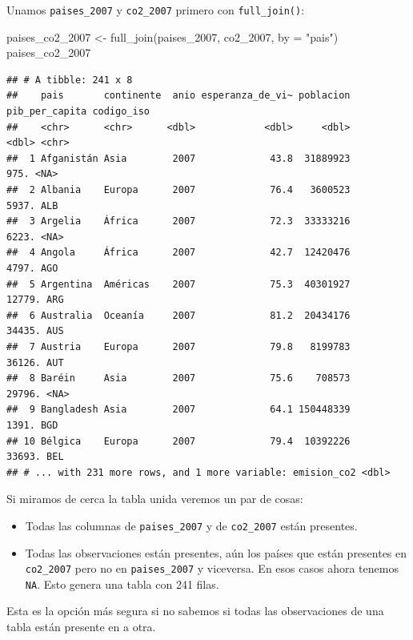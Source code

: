 \documentclass[
  openany]{book}
\newenvironment{Shaded}{\begin{snugshade}}{\end{snugshade}}
\newcommand{\AttributeTok}[1]{\textcolor[rgb]{0.77,0.63,0.00}{#1}}
\newcommand{\FunctionTok}[1]{\textcolor[rgb]{0.00,0.00,0.00}{#1}}
\newcommand{\NormalTok}[1]{#1}
\newcommand{\OtherTok}[1]{\textcolor[rgb]{0.56,0.35,0.01}{#1}}
\newcommand{\StringTok}[1]{\textcolor[rgb]{0.31,0.60,0.02}{#1}}
\providecommand{\tightlist}{%
  \setlength{\itemsep}{0pt}\setlength{\parskip}{0pt}}
\begin{document}
Unamos \texttt{paises\_2007} y \texttt{co2\_2007} primero con \texttt{full\_join()}:

\begin{Shaded}
\begin{Highlighting}[]
\NormalTok{paises\_co2\_2007 }\OtherTok{\textless{}{-}} \FunctionTok{full\_join}\NormalTok{(paises\_2007, co2\_2007, }\AttributeTok{by =} \StringTok{"pais"}\NormalTok{)}
\NormalTok{paises\_co2\_2007}
\end{Highlighting}
\end{Shaded}

\begin{verbatim}
## # A tibble: 241 x 8
##    pais       continente  anio esperanza_de_vi~ poblacion pib_per_capita codigo_iso
##    <chr>      <chr>      <dbl>            <dbl>     <dbl>          <dbl> <chr>     
##  1 Afganistán Asia        2007             43.8  31889923           975. <NA>      
##  2 Albania    Europa      2007             76.4   3600523          5937. ALB       
##  3 Argelia    África      2007             72.3  33333216          6223. <NA>      
##  4 Angola     África      2007             42.7  12420476          4797. AGO       
##  5 Argentina  Américas    2007             75.3  40301927         12779. ARG       
##  6 Australia  Oceanía     2007             81.2  20434176         34435. AUS       
##  7 Austria    Europa      2007             79.8   8199783         36126. AUT       
##  8 Baréin     Asia        2007             75.6    708573         29796. <NA>      
##  9 Bangladesh Asia        2007             64.1 150448339          1391. BGD       
## 10 Bélgica    Europa      2007             79.4  10392226         33693. BEL       
## # ... with 231 more rows, and 1 more variable: emision_co2 <dbl>
\end{verbatim}

Si miramos de cerca la tabla unida veremos un par de cosas:

\begin{itemize}
\tightlist
\item
  Todas las columnas de \texttt{paises\_2007} y de \texttt{co2\_2007} están presentes.
\item
  Todas las observaciones están presentes, aún los países que están presentes en \texttt{co2\_2007} pero no en \texttt{paises\_2007} y viceversa. En esos casos ahora tenemos \texttt{NA}. Esto genera una tabla con 241 filas.
\end{itemize}

Esta es la opción más segura si no sabemos si todas las observaciones de una tabla están presente en a otra.
\end{document}
